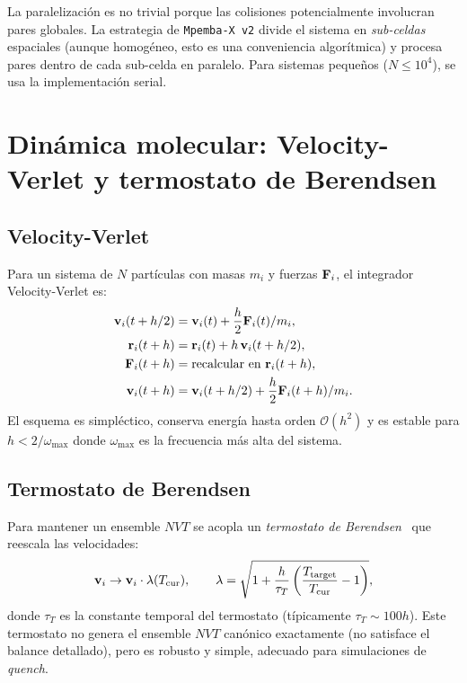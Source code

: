 La paralelización es no trivial porque las colisiones potencialmente involucran 
pares globales. La estrategia de \texttt{Mpemba-X v2} divide el sistema en 
\emph{sub-celdas} espaciales (aunque homogéneo, esto es una conveniencia 
algorítmica) y procesa pares dentro de cada sub-celda en paralelo. Para 
sistemas pequeños ($N \leq 10^4$), se usa la implementación serial.

\section{Dinámica molecular: Velocity-Verlet y termostato de Berendsen}

\subsection{Velocity-Verlet}

Para un sistema de $N$ partículas con masas $m_i$ y fuerzas $\vb{F}_i$, el 
integrador Velocity-Verlet es:
\begin{equation}
\begin{aligned}
    \vb{v}_i(t + h/2) &= \vb{v}_i(t) + \frac{h}{2} \vb{F}_i(t)/m_i, \\
    \vb{r}_i(t + h) &= \vb{r}_i(t) + h \, \vb{v}_i(t + h/2), \\
    \vb{F}_i(t + h) &= \text{recalcular en } \vb{r}_i(t+h), \\
    \vb{v}_i(t + h) &= \vb{v}_i(t + h/2) + \frac{h}{2} \vb{F}_i(t+h)/m_i.
\end{aligned}
\end{equation}
%
El esquema es simpléctico, conserva energía hasta orden $\mathcal{O}(h^2)$ y 
es estable para $h < 2/\omega_{\max}$ donde $\omega_{\max}$ es la frecuencia 
más alta del sistema.

\subsection{Termostato de Berendsen}

Para mantener un ensemble $NVT$ se acopla un \emph{termostato de 
Berendsen}~\cite{berendsen1984} que reescala las velocidades:
\begin{equation}
    \vb{v}_i \to \vb{v}_i \cdot \lambda(T_{\mathrm{cur}}), 
    \qquad \lambda = \sqrt{1 + \frac{h}{\tau_T}\left(\frac{T_{\mathrm{target}}}{T_{\mathrm{cur}}} - 1\right)},
\end{equation}
%
donde $\tau_T$ es la constante temporal del termostato (típicamente 
$\tau_T \sim 100 h$). Este termostato no genera el ensemble $NVT$ canónico 
exactamente (no satisface el balance detallado), pero es robusto y simple, 
adecuado para simulaciones de \emph{quench}.

